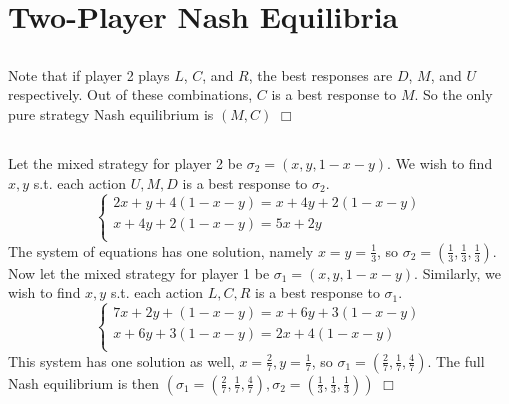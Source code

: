 \documentclass{article}
\begin{document}
\section{Two-Player Nash Equilibria}
\subsection{}
Note that if player 2 plays $L$, $C$, and $R$, the best responses are $D$, $M$, and $U$ respectively. Out of these combinations, $C$ is a best response to $M$. So the only pure strategy Nash equilibrium is $(M,C)$ $\Box$
\subsection{}
Let the mixed strategy for player 2 be $\sigma_2 = (x,y,1-x-y)$. We wish to find $x,y$ s.t. each action $U,M,D$ is a best response to $\sigma_2$.
\begin{equation*}
    \begin{cases}
        2x + y + 4(1-x-y) = x + 4y + 2(1-x-y)\\
        x + 4y + 2(1-x-y) = 5x + 2y\\
    \end{cases}
\end{equation*}
The system of equations has one solution, namely $x = y= \frac{1}{3}$, so $\sigma_2 = (\frac{1}{3},\frac{1}{3},\frac{1}{3})$.\\
Now let the mixed strategy for player 1 be $\sigma_1 = (x,y,1-x-y)$. Similarly, we wish to find $x,y$ s.t. each action $L,C,R$ is a best response to $\sigma_1$.
\begin{equation*}
    \begin{cases}
        7x + 2y + (1-x-y) = x + 6y + 3(1-x-y)\\
        x + 6y + 3(1-x-y) = 2x + 4(1-x-y)\\
    \end{cases}
\end{equation*}
This system has one solution as well, $x = \frac{2}{7}, y = \frac{1}{7}$, so $\sigma_1 = (\frac{2}{7},\frac{1}{7},\frac{4}{7})$. The full Nash equilibrium is then $(\sigma_1 = (\frac{2}{7},\frac{1}{7},\frac{4}{7}), \sigma_2 = (\frac{1}{3},\frac{1}{3},\frac{1}{3}))$ $\Box$
\end{document}
